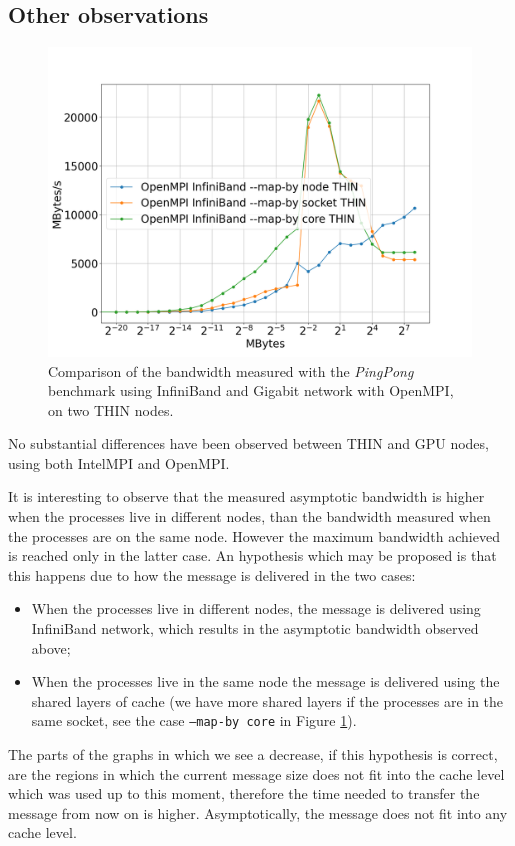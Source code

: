 \documentclass{article}
\begin{document}
\subsection{Other observations}
\begin{figure}[t]
    \centering
    \includegraphics[width=\textwidth]{benchmark/mapby_bandwidth.png}
    \caption{Comparison of the bandwidth measured with the \emph{PingPong} benchmark using InfiniBand and Gigabit network with OpenMPI, on two THIN nodes.}
    \label{fig:mapby}
\end{figure}

No substantial differences have been observed between THIN and GPU nodes, using both IntelMPI and OpenMPI.

It is interesting to observe that the measured asymptotic bandwidth is higher when the processes live in different nodes, than the bandwidth measured when the processes are on the same node. However the maximum bandwidth achieved is reached only in the latter case. An hypothesis which may be proposed is that this happens due to how the message is delivered in the two cases:
\begin{itemize}
    \item When the processes live in different nodes, the message is delivered using InfiniBand network, which results in the asymptotic bandwidth observed above;
    \item When the processes live in the same node the message is delivered using the shared layers of cache (we have more shared layers if the processes are in the same socket, see the case \texttt{--map-by core} in Figure \ref{fig:mapby}).
\end{itemize}
The parts of the graphs in which we see a decrease, if this hypothesis is correct, are the regions in which the current message size does not fit into the cache level which was used up to this moment, therefore the time needed to transfer the message from now on is higher. Asymptotically, the message does not fit into any cache level.
\end{document}
